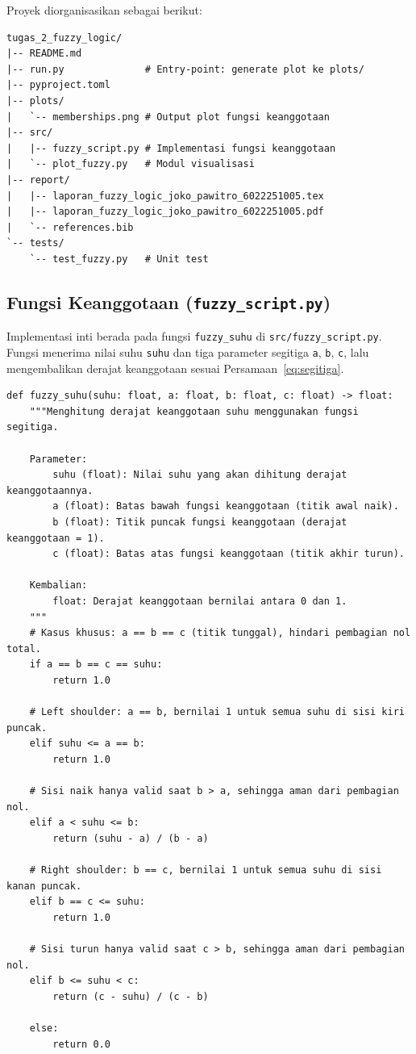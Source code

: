 \documentclass{article}
\begin{document}
Proyek diorganisasikan sebagai berikut:

\begin{lstlisting}[style=python, caption={Struktur direktori proyek}]
tugas_2_fuzzy_logic/
|-- README.md
|-- run.py              # Entry-point: generate plot ke plots/
|-- pyproject.toml
|-- plots/
|   `-- memberships.png # Output plot fungsi keanggotaan
|-- src/
|   |-- fuzzy_script.py # Implementasi fungsi keanggotaan
|   `-- plot_fuzzy.py   # Modul visualisasi
|-- report/
|   |-- laporan_fuzzy_logic_joko_pawitro_6022251005.tex
|   |-- laporan_fuzzy_logic_joko_pawitro_6022251005.pdf
|   `-- references.bib
`-- tests/
    `-- test_fuzzy.py   # Unit test
\end{lstlisting}

\subsection*{Fungsi Keanggotaan (\texttt{fuzzy\_script.py})}

Implementasi inti berada pada fungsi \texttt{fuzzy\_suhu} di \texttt{src/fuzzy\_script.py}.
Fungsi menerima nilai suhu \texttt{suhu} dan tiga parameter segitiga \texttt{a}, \texttt{b},
\texttt{c}, lalu mengembalikan derajat keanggotaan sesuai Persamaan~\ref{eq:segitiga}.

\begin{lstlisting}[style=python, caption={src/fuzzy\_script.py -- fungsi keanggotaan segitiga}]
def fuzzy_suhu(suhu: float, a: float, b: float, c: float) -> float:
    """Menghitung derajat keanggotaan suhu menggunakan fungsi segitiga.

    Parameter:
        suhu (float): Nilai suhu yang akan dihitung derajat keanggotaannya.
        a (float): Batas bawah fungsi keanggotaan (titik awal naik).
        b (float): Titik puncak fungsi keanggotaan (derajat keanggotaan = 1).
        c (float): Batas atas fungsi keanggotaan (titik akhir turun).

    Kembalian:
        float: Derajat keanggotaan bernilai antara 0 dan 1.
    """
    # Kasus khusus: a == b == c (titik tunggal), hindari pembagian nol total.
    if a == b == c == suhu:
        return 1.0

    # Left shoulder: a == b, bernilai 1 untuk semua suhu di sisi kiri puncak.
    elif suhu <= a == b:
        return 1.0

    # Sisi naik hanya valid saat b > a, sehingga aman dari pembagian nol.
    elif a < suhu <= b:
        return (suhu - a) / (b - a)

    # Right shoulder: b == c, bernilai 1 untuk semua suhu di sisi kanan puncak.
    elif b == c <= suhu:
        return 1.0

    # Sisi turun hanya valid saat c > b, sehingga aman dari pembagian nol.
    elif b <= suhu < c:
        return (c - suhu) / (c - b)

    else:
        return 0.0
\end{lstlisting}
\end{document}
